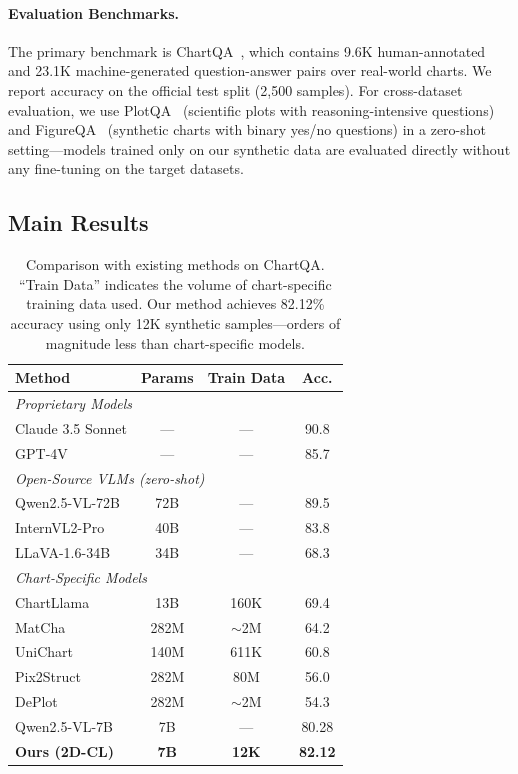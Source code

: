 ﻿\documentclass[journal]{IEEEtran}
\newcommand{\method}{2D-CL}
\begin{document}
\paragraph{Evaluation Benchmarks.}
The primary benchmark is ChartQA~\cite{masry2022chartqa}, which contains 9.6K human-annotated and 23.1K machine-generated question-answer pairs over real-world charts. We report accuracy on the official test split (2,500 samples). For cross-dataset evaluation, we use PlotQA~\cite{methani2020plotqa} (scientific plots with reasoning-intensive questions) and FigureQA~\cite{kahou2017figureqa} (synthetic charts with binary yes/no questions) in a zero-shot setting---models trained only on our synthetic data are evaluated directly without any fine-tuning on the target datasets.

\subsection{Main Results}
\label{sec:main_results}
\begin{table}[!t]
\centering
\small
\begin{tabular}{lccc}
\toprule
\textbf{Method} & \textbf{Params} & \textbf{Train Data} & \textbf{Acc.} \\
\midrule
\multicolumn{4}{l}{\textit{Proprietary Models}} \\
Claude 3.5 Sonnet & --- & --- & 90.8 \\
GPT-4V & --- & --- & 85.7 \\
\midrule
\multicolumn{4}{l}{\textit{Open-Source VLMs (zero-shot)}} \\
Qwen2.5-VL-72B & 72B & --- & 89.5 \\
InternVL2-Pro & 40B & --- & 83.8 \\
LLaVA-1.6-34B & 34B & --- & 68.3 \\
\midrule
\multicolumn{4}{l}{\textit{Chart-Specific Models}} \\
ChartLlama & 13B & 160K & 69.4 \\
MatCha & 282M & $\sim$2M & 64.2 \\
UniChart & 140M & 611K & 60.8 \\
Pix2Struct & 282M & 80M & 56.0 \\
DePlot & 282M & $\sim$2M & 54.3 \\
\midrule
Qwen2.5-VL-7B & 7B & --- & 80.28 \\
\textbf{Ours (\method{})} & \textbf{7B} & \textbf{12K} & \textbf{82.12} \\
\bottomrule
\end{tabular}
\caption{Comparison with existing methods on ChartQA. ``Train Data'' indicates the volume of chart-specific training data used. Our method achieves 82.12\% accuracy using only 12K synthetic samples---orders of magnitude less than chart-specific models.}
\label{tab:sota}
\end{table}
\end{document}
